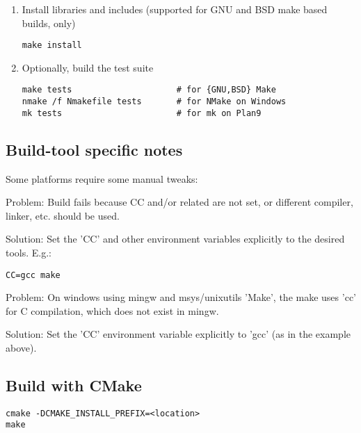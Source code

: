 \begin{enumerate}
\item Install libraries and includes (supported for GNU and BSD make based builds, only)
\begin{lstlisting}
make install 
\end{lstlisting}

\item Optionally, build the test suite
\begin{lstlisting}
make tests                     # for {GNU,BSD} Make
nmake /f Nmakefile tests       # for NMake on Windows
mk tests                       # for mk on Plan9
\end{lstlisting}%
\end{enumerate}

\subsection{Build-tool specific notes}

Some platforms require some manual tweaks:

Problem: Build fails because CC and/or related are not set, or different compiler,
linker, etc. should be used.

Solution: Set the 'CC' and other environment variables explicitly to the desired
tools. E.g.:

\begin{lstlisting}
CC=gcc make
\end{lstlisting}


Problem: On windows using mingw and msys/unixutils 'Make', the make uses
'cc' for C compilation, which does not exist in mingw.

Solution: Set the 'CC' environment variable explicitly to 'gcc' (as in
the example above).

\subsection{Build with CMake}

\begin{lstlisting}
cmake -DCMAKE_INSTALL_PREFIX=<location>
make
\end{lstlisting}

